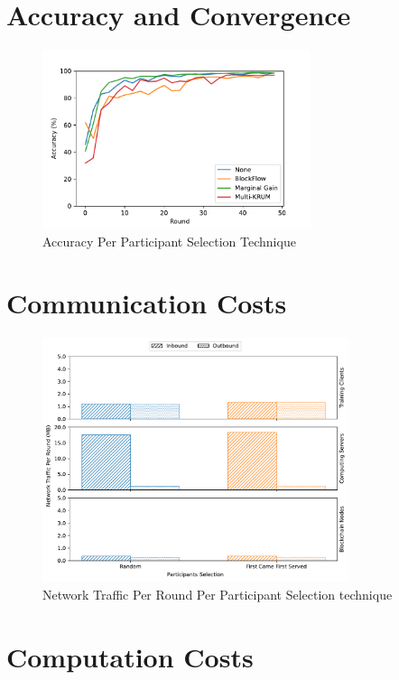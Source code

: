\section{Accuracy and Convergence}

\begin{figure}[!ht]
    \centering
    \centering
    \includegraphics[width=0.7\textwidth]{graphics/04_scoring_accuracy.pdf}
    \caption{Accuracy Per Participant Selection Technique}
    \label{fig:accuracy_selection}
\end{figure}

\section{Communication Costs}

\begin{figure}[!ht]
    \centering
    \centering
    \includegraphics[width=0.8\textwidth]{graphics/02_selection_net.pdf}
    \caption{Network Traffic Per Round Per Participant Selection technique}
    \label{fig:net_selection}
\end{figure}

\section{Computation Costs}

